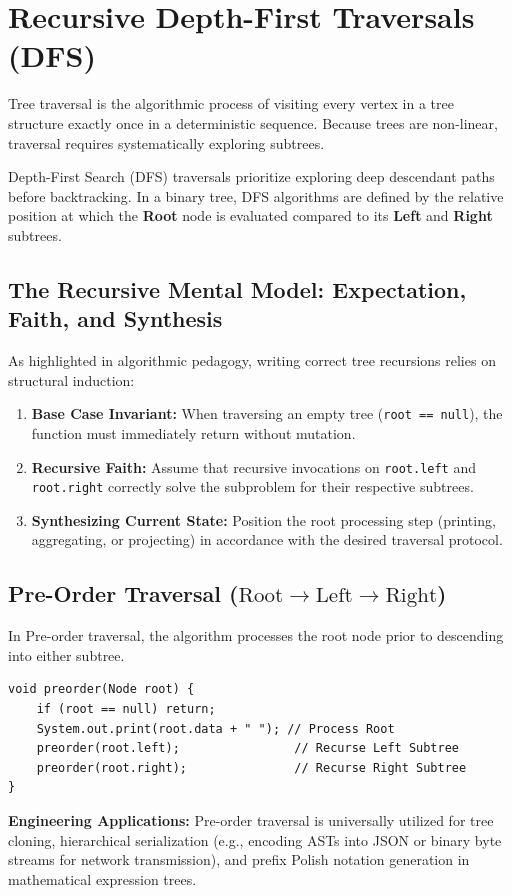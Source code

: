 \documentclass[10pt,journal,compsoc,onecolumn]{IEEEtran}
\begin{document}
\section{Recursive Depth-First Traversals (DFS)}
\label{sec:recursive_traversals}

Tree traversal is the algorithmic process of visiting every vertex in a tree structure exactly once in a deterministic sequence. Because trees are non-linear, traversal requires systematically exploring subtrees.

Depth-First Search (DFS) traversals prioritize exploring deep descendant paths before backtracking. In a binary tree, DFS algorithms are defined by the relative position at which the \textbf{Root} node is evaluated compared to its \textbf{Left} and \textbf{Right} subtrees.

\subsection{The Recursive Mental Model: Expectation, Faith, and Synthesis}

As highlighted in algorithmic pedagogy, writing correct tree recursions relies on structural induction:
\begin{enumerate}
    \item \textbf{Base Case Invariant:} When traversing an empty tree (\texttt{root == null}), the function must immediately return without mutation.
    \item \textbf{Recursive Faith:} Assume that recursive invocations on \texttt{root.left} and \texttt{root.right} correctly solve the subproblem for their respective subtrees.
    \item \textbf{Synthesizing Current State:} Position the root processing step (printing, aggregating, or projecting) in accordance with the desired traversal protocol.
\end{enumerate}

\subsection{Pre-Order Traversal ($\text{Root} \to \text{Left} \to \text{Right}$)}

In Pre-order traversal, the algorithm processes the root node prior to descending into either subtree.
\begin{verbatim}
void preorder(Node root) {
    if (root == null) return;
    System.out.print(root.data + " "); // Process Root
    preorder(root.left);                // Recurse Left Subtree
    preorder(root.right);               // Recurse Right Subtree
}
\end{verbatim}
\textbf{Engineering Applications:} Pre-order traversal is universally utilized for tree cloning, hierarchical serialization (e.g., encoding ASTs into JSON or binary byte streams for network transmission), and prefix Polish notation generation in mathematical expression trees.
\end{document}
